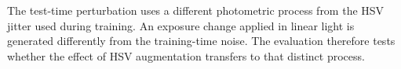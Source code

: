 The test-time perturbation uses a different photometric process from the HSV
jitter used during training. An exposure change applied in linear light is
generated differently from the training-time noise. The evaluation therefore
tests whether the effect of HSV augmentation transfers to that distinct
process.
